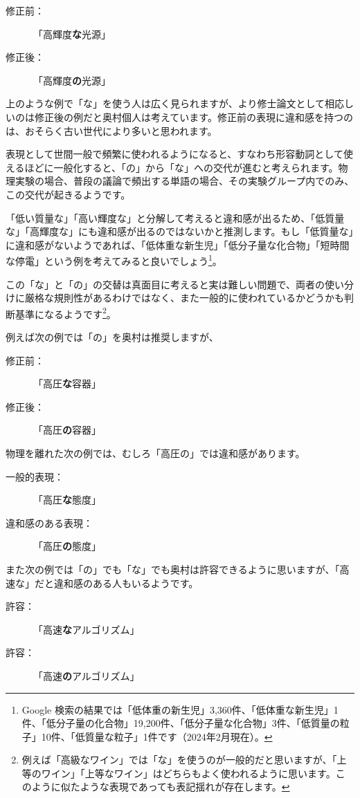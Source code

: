\begin{description}
\item[修正前：]「高輝度\textbf{な}光源」
\item[修正後：]「高輝度\textbf{の}光源」
\end{description}

上のような例で「な」を使う人は広く見られますが、より修士論文として相応しいのは修正後の例だと奥村個人は考えています。修正前の表現に違和感を持つのは、おそらく古い世代により多いと思われます。

表現として世間一般で頻繁に使われるようになると、すなわち形容動詞として使えるほどに一般化すると、「の」から「な」への交代が進むと考えられます。物理実験の場合、普段の議論で頻出する単語の場合、その実験グループ内でのみ、この交代が起きるようです。

「低い質量な」「高い輝度な」と分解して考えると違和感が出るため、「低質量な」「高輝度な」にも違和感が出るのではないかと推測します。もし「低質量な」に違和感がないようであれば、「低体重な新生児」「低分子量な化合物」「短時間な停電」という例を考えてみると良いでしょう\footnote{Google 検索の結果では「低体重の新生児」3,360件、「低体重な新生児」1件、「低分子量の化合物」19,200件、「低分子量な化合物」3件、「低質量の粒子」10件、「低質量な粒子」1件です（2024年2月現在）。}。

この「な」と「の」の交替は真面目に考えると実は難しい問題で、両者の使い分けに厳格な規則性があるわけではなく、また一般的に使われているかどうかも判断基準になるようです\footnote{例えば「高級なワイン」では「な」を使うのが一般的だと思いますが、「上等のワイン」「上等なワイン」はどちらもよく使われるように思います。このように似たような表現であっても表記揺れが存在します。}。

例えば次の例では「の」を奥村は推奨しますが、
\begin{description}
\item[修正前：]「高圧\textbf{な}容器」
\item[修正後：]「高圧\textbf{の}容器」
\end{description}
物理を離れた次の例では、むしろ「高圧の」では違和感があります。
\begin{description}
\item[一般的表現：]「高圧\textbf{な}態度」
\item[違和感のある表現：]「高圧\textbf{の}態度」
\end{description}

また次の例では「の」でも「な」でも奥村は許容できるように思いますが、「高速な」だと違和感のある人もいるようです。
\begin{description}
\item[許容：]「高速\textbf{な}アルゴリズム」
\item[許容：]「高速\textbf{の}アルゴリズム」
\end{description}


